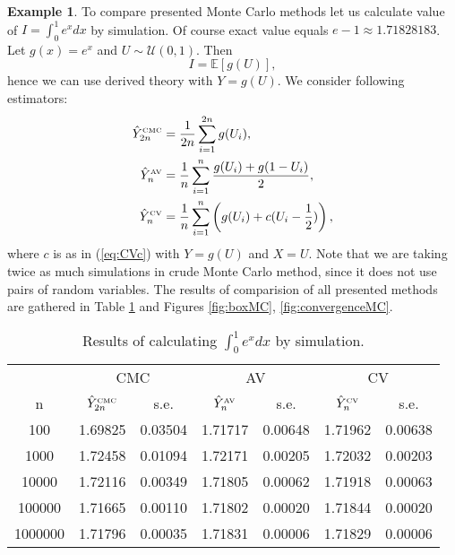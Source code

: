 \documentclass[a4paper,12pt, oneside]{book}
\theoremstyle{definition}
\newtheorem{example}{Example}[chapter]
\theoremstyle{remark}
\def\E{{\mathbb{E}}}
\def\CMC[#1]{\hat{Y}^{\hbox{\tiny CMC}}_{#1}}
\def\AV[#1]{\hat{Y}^{\hbox{\tiny AV}}_{#1}}
\def\CV[#1]{\hat{Y}^{\hbox{\tiny CV}}_{#1}}
\begin{document}
\begin{example}
To compare presented Monte Carlo methods let us calculate value of $I = \int_0^1 e^x dx$ by simulation. Of course exact value equals $e - 1 \approx 1.71828183$. Let $g(x) = e^x$ and $U \sim \mathcal{U}(0,1)$. Then 
\[ I = \E[g(U)], \]
 hence we can use derived theory with $Y = g(U)$. We consider following estimators:
 \begin{equation*}
  \begin{split}
   \CMC[2n] &= \frac{1}{2n} \sum\limits_{i=1}^{2n} g(U_i), \\
   \AV[n] &= \frac{1}{n} \sum\limits_{i=1}^{n} \frac{g(U_i) + g(1-U_i)}{2}, \\ 
   \CV[n] &= \frac{1}{n} \sum\limits_{i=1}^{n} \left( g(U_i) + c(U_i - \frac{1}{2}) \right),
  \end{split}
 \end{equation*}
where $c$ is as in (\ref{eq:CVc}) with $Y = g(U)$ and $X = U$. Note that we are taking twice as much simulations in crude Monte Carlo method, since it does not use pairs of random variables. The results of comparision of all presented methods are gathered in Table \ref{tab:MCcompare} and Figures \ref{fig:boxMC}, \ref{fig:convergenceMC}.

\begin{table}
\centering
 \caption{Results of calculating $\int_0^1 e^x dx$ by simulation.}
 \label{tab:MCcompare}
\begin{tabular} {||c | c | c | c | c |c | c ||}  
 \hline 
  & \multicolumn{2}{|c|}{ CMC } & \multicolumn{2}{|c|}{ AV } & \multicolumn{2}{|c|}{ CV } \\
  n & \multicolumn{1}{c}{ $\CMC[2n]$ } & \multicolumn{1}{c|}{ s.e. } & \multicolumn{1}{c}{ $\AV[n]$ } & \multicolumn{1}{c|}{ s.e. } & \multicolumn{1}{c}{ $\CV[n]$ } & \multicolumn{1}{c|}{ s.e. } \\ \hline \hline 
100    & 1.69825 & 0.03504 & 1.71717 & 0.00648 & 1.71962 & 0.00638 \\ \hline 
1000   & 1.72458 & 0.01094 & 1.72171 & 0.00205 & 1.72032 & 0.00203 \\ \hline 
10000  & 1.72116 & 0.00349 & 1.71805 & 0.00062 & 1.71918 & 0.00063 \\ \hline 
100000 & 1.71665 & 0.00110 & 1.71802 & 0.00020 & 1.71844 & 0.00020 \\ \hline 
1000000& 1.71796 & 0.00035 & 1.71831 & 0.00006 & 1.71829 & 0.00006 \\ \hline 
\end{tabular}  
\end{table}


\end{example}
\end{document}
